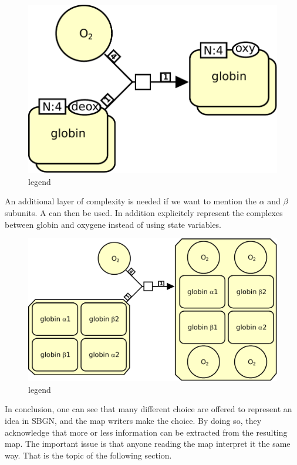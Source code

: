 \begin{figure}[H]
  \centering
  \includegraphics[scale = 0.4]{images/hemoglobin-multimer}
  \caption{legend}
  \label{fig:hemoglobin-multimer}
\end{figure}

An additional layer of complexity is needed if we want to mention the $\alpha$ and $\beta$ subunits. A  can then be used. In addition  explicitely represent the complexes between globin and oxygene instead of using state variables.

\begin{figure}[H]
  \centering
  \includegraphics[scale = 0.4]{images/hemoglobin-complex}
  \caption{legend}
  \label{fig:hemoglobin-complex}
\end{figure}

In conclusion, one can see that many different choice are offered to represent an idea in SBGN, and the map writers make the choice. By doing so, they acknowledge that more or less information can be extracted from the resulting map. The important issue is that anyone reading the map interpret it the same way. That is the topic of the following section. 

